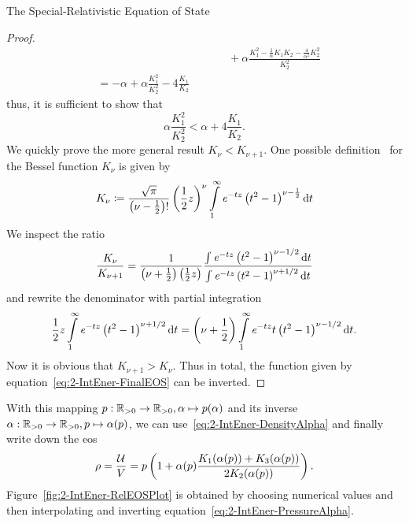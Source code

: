 \begin{subsection}{The Special-Relativistic Equation of State}
\begin{proof}
\begin{align}
		&\hspace{5cm}+\alpha\frac{K_1^2-\frac{1}{\alpha}K_1 K_2-\frac{4}{\alpha^2}K_2^2}{K_2^2}\\
		&= -\alpha + \alpha\frac{K_1^2}{K_2^2} - 4\frac{K_1}{K_2}
	\end{align}
	thus, it is sufficient to show that
	\begin{equation}
		\alpha\frac{K_1^2}{K_2^2}  < \alpha + 4\frac{K_1}{K_2}.
		\label{eq:2-IntEner-BesselK-Ineq-K1-over-K2}
	\end{equation}
	We quickly prove the more general result $K_\nu<K_{\nu+1}$.
	One possible definition~\cite{abramowitzPocketbookMathematicalFunctions1984} for the Bessel function $K_\nu$ is given by
	\begin{equation}
		K_\nu \coloneqq \frac{\sqrt{\pi}}{\left(\nu-\frac{1}{2}\right)!}\left(\frac{1}{2}z\right)^\nu\int\limits_1^\infty\mathit{e}^{-tz}\left(t^2-1\right)^{\nu-\frac{1}{2}}\mathop{}\!\mathrm{d} t
		\label{eq:2-IntEner-BesselK-Def}
	\end{equation}
	We inspect the ratio
	\begin{equation}
		\frac{K_\nu}{K_{\nu+1}} = \frac{1}{\left(\nu+\frac{1}{2}\right)\left(\frac{1}{2}z\right)}\frac{\int\mathit{e}^{-tz}\left(t^2-1\right)^{\nu-1/2}\mathop{}\!\mathrm{d} t}{\int\mathit{e}^{-tz}\left(t^2-1\right)^{\nu+1/2}\mathop{}\!\mathrm{d} t}
		\label{eq:2-IntEner-BesselK-Ratio}
	\end{equation}
	and rewrite the denominator with partial integration
	\begin{equation}
		 \frac{1}{2}z\int\limits_1^\infty\mathit{e}^{-tz}\left(t^2-1\right)^{\nu+1/2}\mathop{}\!\mathrm{d} t = \left(\nu+\frac{1}{2}\right)\int\limits_1^\infty \mathit{e}^{-tz}t\left(t^2-1\right)^{\nu-1/2}\mathop{}\!\mathrm{d} t.
		 \label{eq:2-IntEner-BesselK-Integral-Evaluation}
	\end{equation}
	Now it is obvious that $K_{\nu+1}>K_\nu$.
	Thus in total, the function given by equation~\eqref{eq:2-IntEner-FinalEOS} can be inverted.
\end{proof}%
%
%
\noindent With this mapping $p:\mathbb{R}_{>0}\rightarrow \mathbb{R}_{>0},\alpha\mapsto p(\alpha)$ and its inverse $\alpha:\mathbb{R}_{>0}\rightarrow \mathbb{R}_{>0},p\mapsto \alpha(p)$, we can use~\eqref{eq:2-IntEner-DensityAlpha} and finally write down the \ac{eos}
\begin{equation}
	\rho = \frac{\mathcal{U}}{V} = p\left(1+\alpha(p)\frac{K_1 (\alpha(p))+K_3(\alpha(p))}{2K_2 (\alpha(p))}\right).
	\label{eq:2-IntEner-FinalEOS}
\end{equation}
Figure~\ref{fig:2-IntEner-RelEOSPlot} is obtained by choosing numerical values and then interpolating and inverting equation~\eqref{eq:2-IntEner-PressureAlpha}.

\end{subsection}
